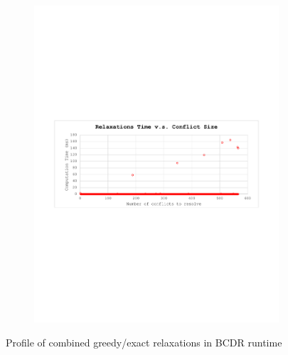 \documentclass[jair,twoside,11pt,theapa]{article}
\begin{document}
\begin{figure}[!ht]
\begin{subfigure}[b]{0.8\textwidth}
		\includegraphics[width=\textwidth,trim={2.6cm 10.2cm 2.4cm 10.3cm},clip]{figures/BunchConflict/relaxation_time_400bunch.pdf}
		\caption{}
		\label{fig:cont_relaxation_time_improved}
	\end{subfigure}
	\caption{Profile of combined greedy/exact relaxations in BCDR runtime}
	\label{fig:conflict_resolution_time_improved}
\end{figure}
\end{document}
